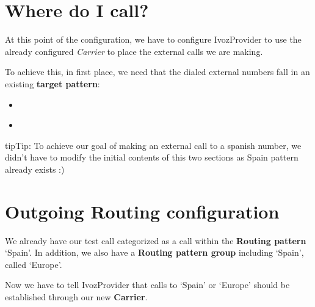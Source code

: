 \documentclass[letterpaper,10pt,english]{sphinxmanual}
\begin{document}
\section{Where do I call?}
\label{getting_started/external_outgoing_calls/where_do_i_call::doc}\label{getting_started/external_outgoing_calls/where_do_i_call:where-do-i-call}
At this point of the configuration, we have to configure IvozProvider to use the
already configured \emph{Carrier} to place the external calls we are making.

To achieve this, in first place, we need that the dialed external numbers fall
in an existing \textbf{target pattern}:
\begin{itemize}
\item {} 
{\hyperref[administration_portal/brand/routing/routing_patterns:routing\string-patterns]{}}

\item {} 
{\hyperref[administration_portal/brand/routing/routing_patterns_groups:routing\string-pattern\string-groups]{}}

\end{itemize}

\begin{notice}{tip}{Tip:}
To achieve our goal of making an external call to a spanish number, we didn't have
to modify the initial contents of this two sections as Spain pattern already exists :)
\end{notice}


\section{Outgoing Routing configuration}
\label{getting_started/external_outgoing_calls/call_routing:outgoing-routing-configuration}\label{getting_started/external_outgoing_calls/call_routing::doc}
We already have our test call categorized as a call within the \textbf{Routing pattern}
`Spain'. In addition, we also have a \textbf{Routing pattern group} including `Spain',
called `Europe'.

Now we have to tell IvozProvider that calls to `Spain' or `Europe' should be
established through our new \textbf{Carrier}.
\end{document}
